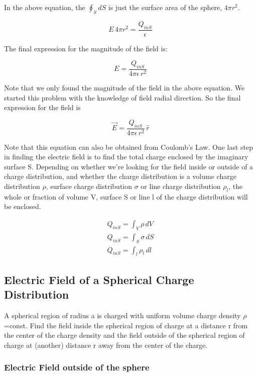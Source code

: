 \documentclass{ximera}
\begin{document}
In the above equation, the $\oint_S dS $ is just the surface area of the sphere, $4 \pi r^2$.


\begin{equation}
 E \, 4 \pi r^2 = \frac{Q_{inS}}{\epsilon}
\end{equation}

The final expression for the magnitude of the field is:


\begin{equation}
 E  = \frac{Q_{inS}}{4 \pi  \epsilon \, r^2}
\end{equation}

Note that we only found the magnitude of the field in the above equation. We started this problem with the knowledge of field radial direction. So the final expression for the field is

\begin{equation}
 \vec{E}  = \frac{Q_{inS}}{4 \pi  \epsilon \, r^2} \, \hat{r}
\end{equation}

Note that this equation can also be obtained from Coulomb's Law. One last step in finding the electric field is to find the total charge enclosed by the imaginary surface S. Depending on whether we're looking for the field inside or outside of a charge distribution, and whether the charge distribution is a volume charge distribution $\rho$, surface charge distribution $\sigma$ or line charge distribution $\rho_l$, the whole or fraction of volume V, surface S or line l of the charge distribution will be enclosed. 

\begin{eqnarray}
Q_{inS} = \int_V \rho \, dV \\
Q_{inS} =\int_S \sigma \, dS \\
Q_{inS} = \int_l \rho_l \, dl 
\end{eqnarray}

\subsection{Electric Field of a  Spherical Charge Distribution}


A spherical region of radius a is charged with uniform volume charge density $\rho$=const. Find the field inside the spherical region of charge at a distance r from the center of the charge density and the field outside of the spherical region of charge at (another) distance r away from the center of the charge.

\subsubsection{Electric Field outside of the sphere}
\end{document}
